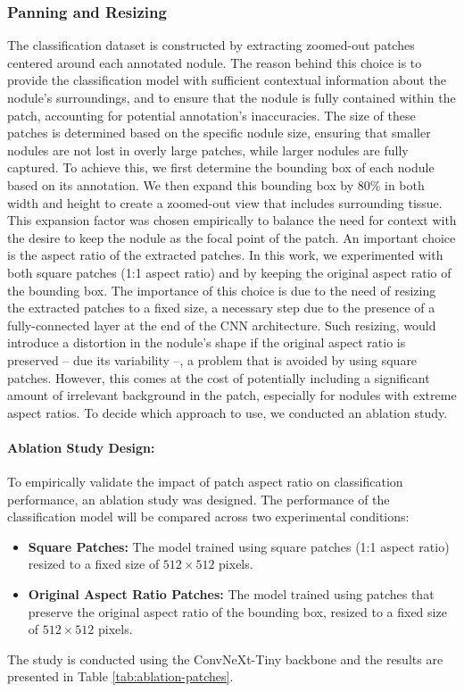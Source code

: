 \subsubsection{Panning and Resizing}
The classification dataset is constructed by extracting zoomed-out patches centered around each annotated nodule. The reason behind this choice is to provide the classification model with sufficient contextual information about the nodule's surroundings, and to ensure that the nodule is fully contained within the patch, accounting for potential annotation's inaccuracies. The size of these patches is determined based on the specific nodule size, ensuring that smaller nodules are not lost in overly large patches, while larger nodules are fully captured.
To achieve this, we first determine the bounding box of each nodule based on its annotation. We then expand this bounding box by 80\% in both width and height to create a zoomed-out view that includes surrounding tissue.
This expansion factor was chosen empirically to balance the need for context with the desire to keep the nodule as the focal point of the patch.
An important choice is the aspect ratio of the extracted patches. In this work, we experimented with both square patches (1:1 aspect ratio) and by keeping the original aspect ratio of the bounding box. The importance of this choice is due to the need of resizing the extracted patches to a fixed size, a necessary step due to the presence of a fully-connected layer at the end of the CNN architecture. Such resizing, would introduce a distortion in the nodule's shape if the original aspect ratio is preserved -- due its variability --, a problem that is avoided by using square patches. However, this comes at the cost of potentially including a significant amount of irrelevant background in the patch, especially for nodules with extreme aspect ratios. 
To decide which approach to use, we conducted an ablation study.

\paragraph{Ablation Study Design:}
To empirically validate the impact of patch aspect ratio on classification performance, an ablation study was designed. The performance of the classification model will be compared across two experimental conditions:
\begin{itemize}
    \item \textbf{Square Patches:} The model trained using square patches (1:1 aspect ratio) resized to a fixed size of $512\times512$ pixels.
    \item \textbf{Original Aspect Ratio Patches:} The model trained using patches that preserve the original aspect ratio of the bounding box, resized to a fixed size of $512\times512$ pixels. 
\end{itemize}
The study is conducted using the ConvNeXt-Tiny backbone \cite{liu2022convnext} and the results are presented in Table \ref{tab:ablation-patches}.


